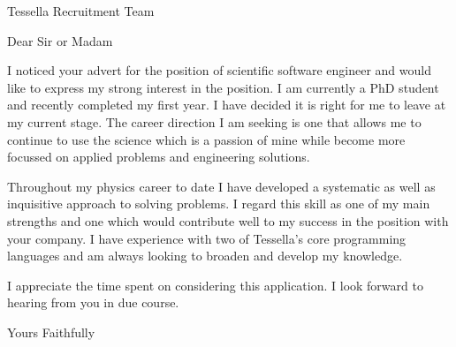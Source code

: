 \documentclass[10pt,a4paper]{letter}
\begin{document}
\begin{letter}{Tessella Recruitment Team \\} 
\opening{Dear Sir or Madam}
I noticed your advert for the position of scientific software engineer and would like to express my strong interest in the position. I am currently a PhD student and recently completed my first year. I have decided it is right for me to leave at my current stage. The career direction I am seeking is one that allows me to continue to use the science which is a passion of mine while become more focussed on applied problems and engineering solutions.

Throughout my physics career to date I have developed a systematic as well as inquisitive approach to solving problems. I regard this skill as one of my main strengths and one which would contribute well to my success in the position with your company. I have experience with two of Tessella's core programming languages and am always looking to broaden and develop my knowledge.

I appreciate the time spent on considering this application. I look forward to hearing from you in due course.

\closing{Yours Faithfully} 
\end{letter} 
\end{document}
